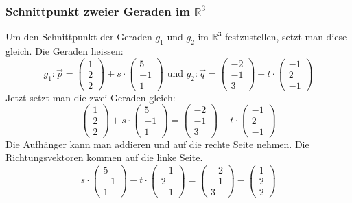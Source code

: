 \subsubsection{Schnittpunkt zweier Geraden im $\mathbb{R}^3$}
Um den Schnittpunkt der Geraden $g_1$ und $g_2$ im $\mathbb{R}^3$ festzustellen, setzt man
diese gleich. Die Geraden heissen:
\[ g_1 : \vec{p} = \left( \begin{array}{c} 1 \\2 \\2 \end{array} \right)
  + s \cdot \left( \begin{array}{c} 5 \\ -1 \\ 1 \end{array} \right)
  \text{ und }
  g_2 : \vec{q} = \left( \begin{array}{c} -2 \\-1 \\3 \end{array} \right)
  + t \cdot \left( \begin{array}{c} -1 \\ 2 \\ -1 \end{array} \right) \]
Jetzt setzt man die zwei Geraden gleich:
\[ \left( \begin{array}{c} 1 \\2 \\2 \end{array} \right)
  + s \cdot \left( \begin{array}{c} 5 \\ -1 \\ 1 \end{array} \right)
  = \left( \begin{array}{c} -2 \\-1 \\3 \end{array} \right)
  + t \cdot \left( \begin{array}{c} -1 \\ 2 \\ -1 \end{array} \right) \]
Die Aufhänger kann man addieren und auf die rechte Seite nehmen. Die
Richtungsvektoren kommen auf die linke Seite.
\[
  s \cdot \left( \begin{array}{c} 5 \\ -1 \\ 1 \end{array} \right)
  - t \cdot \left( \begin{array}{c} -1 \\ 2 \\ -1 \end{array} \right)
  = \left( \begin{array}{c} -2 \\-1 \\3 \end{array} \right) -
  \left( \begin{array}{c} 1 \\2 \\2 \end{array} \right)
\]
